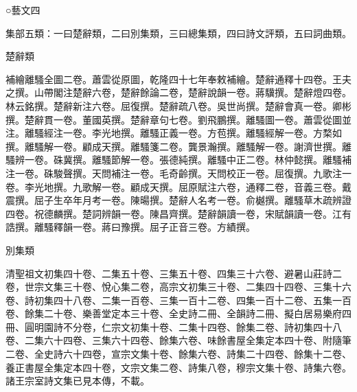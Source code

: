 
\begin{pinyinscope}
○藝文四

集部五類：一曰楚辭類，二曰別集類，三曰總集類，四曰詩文評類，五曰詞曲類。

楚辭類

補繪離騷全圖二卷。蕭雲從原圖，乾隆四十七年奉敕補繪。楚辭通釋十四卷。王夫之撰。山帶閣注楚辭六卷，楚辭餘論二卷，楚辭說韻一卷。蔣驥撰。楚辭燈四卷。林云銘撰。楚辭新注六卷。屈復撰。楚辭疏八卷。吳世尚撰。楚辭會真一卷。卿彬撰。楚辭貫一卷。董國英撰。楚辭章句七卷。劉飛鵬撰。離騷圖一卷。蕭雲從圖並注。離騷經注一卷。李光地撰。離騷正義一卷。方苞撰。離騷經解一卷。方楘如撰。離騷解一卷。顧成天撰。離騷箋二卷。龔景瀚撰。離騷解一卷。謝濟世撰。離騷辨一卷。硃冀撰。離騷節解一卷。張德純撰。離騷中正二卷。林仲懿撰。離騷補注一卷。硃駿聲撰。天問補注一卷。毛奇齡撰。天問校正一卷。屈復撰。九歌注一卷。李光地撰。九歌解一卷。顧成天撰。屈原賦注六卷，通釋二卷，音義三卷。戴震撰。屈子生卒年月考一卷。陳暘撰。楚辭人名考一卷。俞樾撰。離騷草木疏辨證四卷。祝德麟撰。楚詞辨韻一卷。陳昌齊撰。楚辭韻讀一卷，宋賦韻讀一卷。江有誥撰。離騷釋韻一卷。蔣曰豫撰。屈子正音三卷。方績撰。

別集類

清聖祖文初集四十卷、二集五十卷、三集五十卷、四集三十六卷、避暑山莊詩二卷，世宗文集三十卷、悅心集二卷，高宗文初集三十卷、二集四十四卷、三集十六卷、詩初集四十八卷、二集一百卷、三集一百十二卷、四集一百十二卷、五集一百卷、餘集二十卷、樂善堂定本三十卷、全史詩二冊、全韻詩二冊、擬白居易樂府四冊、圓明園詩不分卷，仁宗文初集十卷、二集十四卷、餘集二卷、詩初集四十八卷、二集六十四卷、三集六十四卷、餘集六卷、味餘書屋全集定本四十卷、附隨筆二卷、全史詩六十四卷，宣宗文集十卷、餘集六卷、詩集二十四卷、餘集十二卷、養正書屋全集定本四十卷，文宗文集二卷、詩集八卷，穆宗文集十卷、詩集六卷。諸王宗室詩文集已見本傳，不載。


\end{pinyinscope}
